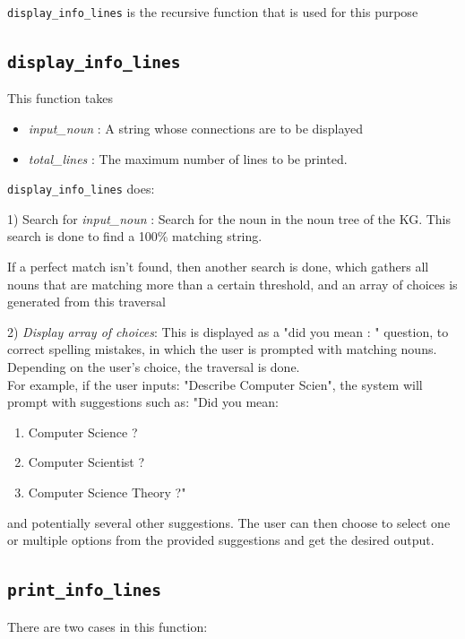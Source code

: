 \documentclass[conference]{IEEEtran}
\begin{document}
\texttt{display\_info\_lines} is the recursive function that is used for this purpose



\subsection{\textbf{\texttt{display\_info\_lines}}}

This function takes
\begin{itemize}
\item \textit{input\_noun} : A string whose connections are to be displayed
\item \textit{total\_lines} : The maximum number of lines to be printed. 
\end{itemize}


\texttt{display\_info\_lines} does:

1) Search for \textit{input\_noun} : Search for the noun in the noun tree of the KG. This search is done to find a 100\% matching string.

If a perfect match isn't found, then another search is done, which gathers all nouns that are matching more than a certain threshold, and an array of choices is generated from this traversal

2) \textit{Display array of choices}: This is displayed as a "did you mean : " question, to correct spelling mistakes, in which the user is prompted with matching nouns. Depending on the user’s choice, the traversal is done.\\

For example, if the user inputs: "Describe Computer Scien", the system will prompt with suggestions such as:
"Did you mean:

\begin{enumerate}
    \item Computer Science ?
    \item Computer Scientist ?
    \item Computer Science Theory ?"
\end{enumerate}

and potentially several other suggestions.
The user can then choose to select one or multiple options from the provided suggestions and get the desired output.


\subsection{\textbf{\texttt{print\_info\_lines}}}
There are two cases in this function:
\end{document}
